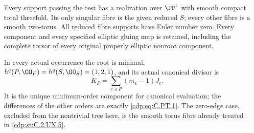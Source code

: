 \begin{proposition}
Every support passing the test has a realization over $\PP^1$
with smooth compact total threefold. Its only singular fibre
is the given reduced $S$; every other fibre is a smooth
two-torus. All reduced fibre supports have Euler number zero.
Every component and every specified elliptic gluing map is
retained, including the complete torsor of every original
properly elliptic nonroot component.

In every actual occurrence the root is minimal,
$h^q(P,\OO_P)=h^q(S,\OO_S)=(1,2,1)$, and its actual canonical
divisor is
\[
                 K_P=\sum_{e\ni P}(m_e-1)J_e.
                 \tag{C.PT.2}\label{cdp:eq:C.PT.2}
\]
It is the unique minimum-order component for canonical evaluation;
the differences of the other orders are exactly \eqref{cdp:eq:C.PT.1}.
The zero-edge case, excluded from the nontrivial tree here,
is the smooth torus fibre already treated in \ref{cdp:st:C.2.UN.5}.
\end{proposition}

